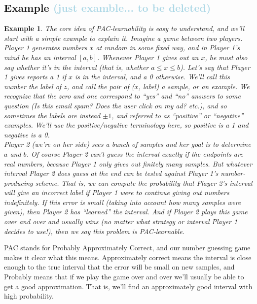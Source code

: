 \documentclass[12pt, a4paper, oneside]{article}
\newtheorem{example}[theorem]{Example}
\begin{document}
\subsection{Example \textbf{\textcolor{lightBlue}{(just examble... to be deleted)}}}
\begin{example}
    The core idea of PAC-learnability is easy to understand, and we’ll start with a simple example to explain it. 
    Imagine a game between two players. Player 1 generates numbers $x$
    at random in some fixed way, and in Player 1’s mind he has an interval $[a, b]$. 
    Whenever Player 1 gives out an $x$, he must also say whether it’s in the interval 
    (that is, whether $a \leq x \leq b$). Let’s say that Player 1 gives reports a 1 if $x$ is in the interval, and a 0 otherwise. 
    We’ll call this number the label of $z$, and call the pair of ($x$, label) a sample, or an example. 
    We recognize that the zero and one correspond to “yes” and “no” answers to some question 
    (Is this email spam? Does the user click on my ad? etc.), and so sometimes the labels are instead $\pm 1$, and referred to as “positive” or “negative” examples. 
    We’ll use the positive/negative terminology here, so positive is a 1 and negative is a 0.
    \\Player 2 (we’re on her side) sees a bunch of samples and her goal is to determine $a$ and $b$. 
    Of course Player 2 can’t guess the interval exactly if the endpoints are real numbers, because Player 1 only gives out finitely many samples. 
    But whatever interval Player 2 does guess at the end can be tested against Player 1’s number-producing scheme. 
    That is, we can compute the probability that Player 2’s interval will give an incorrect label if Player 1 were to continue giving out numbers indefinitely. 
    If this error is small (taking into account how many samples were given), then Player 2 has “learned” the interval. 
    And if Player 2 plays this game over and over and usually wins (no matter what strategy or interval Player 1 decides to use!), then we say this problem is PAC-learnable.
\end{example}
PAC stands for Probably Approximately Correct, and our number guessing game makes it clear what this means. Approximately correct means the interval is close enough to the true interval that the error will be small on new samples, 
and Probably means that if we play the game over and over we’ll usually be able to get a good approximation. 
That is, we’ll find an approximately good interval with high probability.
\end{document}
